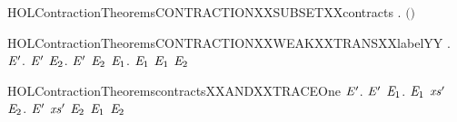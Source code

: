 \newcommand{\HOLContractionTheoremsCONTRACTIONXXEPSYY}{\UseVerbatim{HOLContractionTheoremsCONTRACTIONXXEPSYY}}
\begin{SaveVerbatim}{HOLContractionTheoremsCONTRACTIONXXSUBSETXXcontracts}
\HOLTokenTurnstile{} \HOLSymConst{\HOLTokenForall{}}.   \HOLSymConst{\HOLTokenImp{}}   \ensuremath{(}\ensuremath{)}
\end{SaveVerbatim}
\newcommand{\HOLContractionTheoremsCONTRACTIONXXSUBSETXXcontracts}{\UseVerbatim{HOLContractionTheoremsCONTRACTIONXXSUBSETXXcontracts}}
\begin{SaveVerbatim}{HOLContractionTheoremsCONTRACTIONXXWEAKXXTRANSXXlabelYY}
\HOLTokenTurnstile{} \HOLSymConst{\HOLTokenForall{}}.
         \HOLSymConst{\HOLTokenImp{}}
       \HOLSymConst{\HOLTokenForall{}} \ensuremath{\HOLBoundVar{E}\sp{\prime}}.
             \ensuremath{\HOLBoundVar{E}\sp{\prime}} \HOLSymConst{\HOLTokenImp{}}
           \HOLSymConst{\HOLTokenForall{}} \ensuremath{\HOLBoundVar{E}\sb{\mathrm{2}}}.
               \ensuremath{\HOLBoundVar{E}\sp{\prime}} \HOLTokenWeakTransBegin{} \HOLTokenWeakTransEnd \ensuremath{\HOLBoundVar{E}\sb{\mathrm{2}}} \HOLSymConst{\HOLTokenImp{}}
               \HOLSymConst{\HOLTokenExists{}}\ensuremath{\HOLBoundVar{E}\sb{\mathrm{1}}}.  \HOLTokenWeakTransBegin{} \HOLTokenWeakTransEnd \ensuremath{\HOLBoundVar{E}\sb{\mathrm{1}}} \HOLSymConst{\HOLTokenConj{}}  \ensuremath{\HOLBoundVar{E}\sb{\mathrm{1}}} \ensuremath{\HOLBoundVar{E}\sb{\mathrm{2}}}
\end{SaveVerbatim}
\newcommand{\HOLContractionTheoremsCONTRACTIONXXWEAKXXTRANSXXlabelYY}{\UseVerbatim{HOLContractionTheoremsCONTRACTIONXXWEAKXXTRANSXXlabelYY}}
\begin{SaveVerbatim}{HOLContractionTheoremscontractsXXANDXXTRACEOne}
\HOLTokenTurnstile{} \HOLSymConst{\HOLTokenForall{}} \ensuremath{\HOLBoundVar{E}\sp{\prime}}.
         \ensuremath{\HOLBoundVar{E}\sp{\prime}} \HOLSymConst{\HOLTokenImp{}}
       \HOLSymConst{\HOLTokenForall{}} \ensuremath{\HOLBoundVar{E}\sb{\mathrm{1}}}.
              \ensuremath{\HOLBoundVar{E}\sb{\mathrm{1}}} \HOLSymConst{\HOLTokenImp{}}
           \HOLSymConst{\HOLTokenExists{}}\ensuremath{\HOLBoundVar{xs}\sp{\prime}} \ensuremath{\HOLBoundVar{E}\sb{\mathrm{2}}}.  \ensuremath{\HOLBoundVar{E}\sp{\prime}} \ensuremath{\HOLBoundVar{xs}\sp{\prime}} \ensuremath{\HOLBoundVar{E}\sb{\mathrm{2}}} \HOLSymConst{\HOLTokenConj{}} \ensuremath{\HOLBoundVar{E}\sb{\mathrm{1}}}  \ensuremath{\HOLBoundVar{E}\sb{\mathrm{2}}}
\end{SaveVerbatim}
